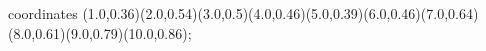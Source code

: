 					coordinates { (1.0,0.36)(2.0,0.54)(3.0,0.5)(4.0,0.46)(5.0,0.39)(6.0,0.46)(7.0,0.64)(8.0,0.61)(9.0,0.79)(10.0,0.86)};